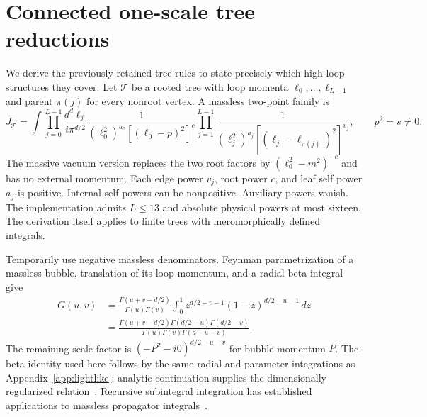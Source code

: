 \section{Connected one-scale tree reductions}
\label{app:trees}
We derive the previously retained tree rules to state precisely which high-loop structures they cover. Let $\mathcal T$ be a rooted tree with loop momenta $\ell_0,\ldots,\ell_{L-1}$ and parent $\pi(j)$ for every nonroot vertex. A massless two-point family is
\begin{equation}
 J_{\mathcal T}=\int\prod_{j=0}^{L-1}\frac{d^d\ell_j}{i\pi^{d/2}}
 \frac{1}{(\ell_0^2)^{a_0}[(\ell_0-p)^2]^c}
 \prod_{j=1}^{L-1}\frac{1}{(\ell_j^2)^{a_j}
 [ (\ell_j-\ell_{\pi(j)})^2]^{v_j}},\qquad p^2=s\ne0.
 \label{eq:tree-family}
\end{equation}
The massive vacuum version replaces the two root factors by $(\ell_0^2-m^2)^{-c}$ and has no external momentum. Each edge power $v_j$, root power $c$, and leaf self power $a_j$ is positive. Internal self powers can be nonpositive. Auxiliary powers vanish. The implementation admits $L\leq13$ and absolute physical powers at most sixteen. The derivation itself applies to finite trees with meromorphically defined integrals.

Temporarily use negative massless denominators. Feynman parametrization of a massless bubble, translation of its loop momentum, and a radial beta integral give
\begin{align}
 G(u,v)&=\frac{\Gamma(u+v-d/2)}{\Gamma(u)\Gamma(v)}
 \int_0^1z^{d/2-v-1}(1-z)^{d/2-u-1}\,dz\nonumber\\
 &=\frac{\Gamma(u+v-d/2)\Gamma(d/2-u)\Gamma(d/2-v)}
 {\Gamma(u)\Gamma(v)\Gamma(d-u-v)}.
 \label{eq:tree-bubble}
\end{align}
The remaining scale factor is $(-P^2-i0)^{d/2-u-v}$ for bubble momentum $P$. The beta identity used here follows by the same radial and parameter integrations as Appendix~\ref{app:lightlike}; analytic continuation supplies the dimensionally regularized relation~\cite{Weinzierl2022}. Recursive subintegral integration has established applications to massless propagator integrals~\cite{Ruijl2017Forcer}.

